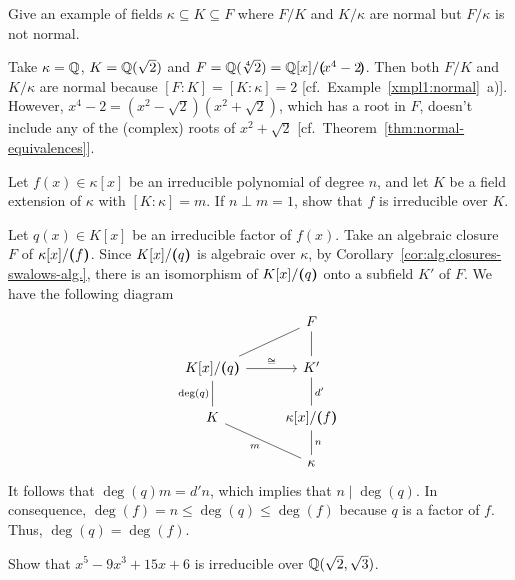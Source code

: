 \begin{probl}
    Give an example of fields\/ $\kappa \subseteq K \subseteq F$ where $F/K$ and\/ $K/\kappa$ are normal but\/ $F/\kappa$ is not normal.
\end{probl}

\begin{solution}
    Take $\kappa=\mathbb{Q}$, $K=\mathbb{Q}(\sqrt2)$ and $F=\mathbb{Q}(\sqrt[4]2)=\mathbb{Q}[x]/\textrm{\boldmath$($}\!x^4-2\!\textrm{\boldmath$)$}$. Then both $F/K$ and $K/\kappa$ are normal because $[F:K]=[K:\kappa]=2$ [cf.~Example~\ref{xmpl1:normal}~a)]. However, $x^4-2=(x^2-\sqrt2)(x^2+\sqrt2)$, which has a root in $F$, doesn't include any of the (complex) roots of $x^2+\sqrt2$ [cf.~Theorem~\ref{thm:normal-equivalences}].
\end{solution}

\begin{probl}
    Let\/ $f(x)\in\kappa[x]$ be an irreducible polynomial 
    of degree\/ $n$, and let\/ $K$ be a field extension of\/ $\kappa$ with\/ $[K \colon \kappa] = m$. If\/ $n\perp m = 1$, show that\/ $f$ is irreducible over\/ $K$.
\end{probl}

\begin{solution}
    Let $q(x)\in K[x]$ be an irreducible factor of $f(x)$. Take an algebraic closure $F$ of $\kappa[x]/\textrm{\boldmath$($}\!\,f\,\!\textrm{\boldmath$)$}$. Since $K[x]/\textrm{\boldmath$($}\!\,q\,\!\textrm{\boldmath$)$}$ is algebraic over $\kappa$, by Corollary~\ref{cor:alg.closures-swalows-alg.}, there is an isomorphism of $K[x]/\textrm{\boldmath$($}\!\,q\,\!\textrm{\boldmath$)$}$ onto a subfield $K'$ of $F$. We have the following diagram
    $$
        \begin{tikzcd}
                &F\\
            K[x]/\gen{\,q\,}
                    \arrow[ur,no head]
                    \arrow[r,"\cong"]
                &K'
                    \arrow[u,no head]\\
            K
                \arrow[u,no head,"\deg(q)"]
                &\kappa[x]/\gen{\,f\,}
                    \arrow[u,no head,"d'"']\\
                &\kappa
                    \arrow[ul,no head,"m"]
                    \arrow[u,no head,"n"']
        \end{tikzcd}
    $$
    It follows that $\deg(q)m = d'n$, which implies that $n\mid\deg(q)$. In consequence, $\deg(f)=n\le\deg(q)\le\deg(f)$ because $q$ is a factor of $f$. Thus, $\deg(q)=\deg(f)$.
\end{solution}


\begin{probl}
    Show that\/ $x^5 - 9x^3 + 15x + 6$ is irreducible over\/ $\mathbb{Q}(\sqrt2, \sqrt3)$.
\end{probl}

